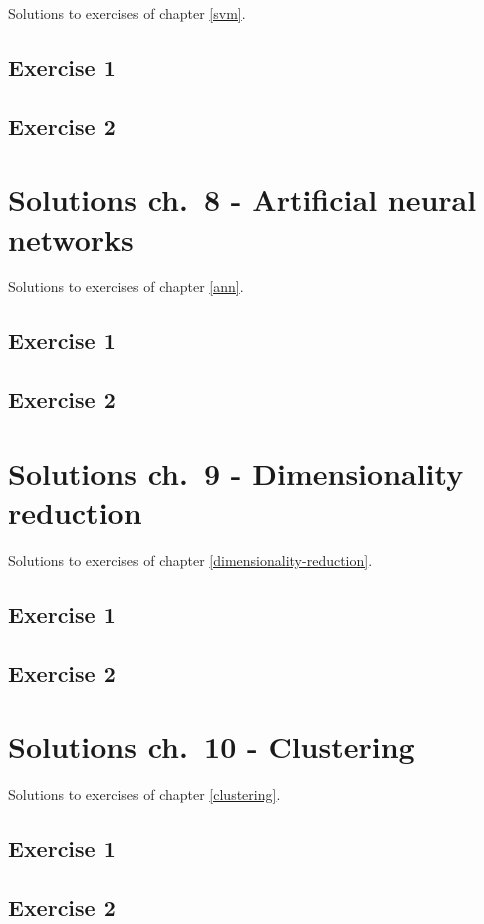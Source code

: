 \documentclass[]{book}
\theoremstyle{definition}
\theoremstyle{definition}
\theoremstyle{definition}
\theoremstyle{remark}
\begin{document}
Solutions to exercises of chapter \ref{svm}.

\section{Exercise 1}\label{exercise-1-4}

\section{Exercise 2}\label{exercise-2-4}

\chapter{Solutions ch.~8 - Artificial neural
networks}\label{solutions-ann}

Solutions to exercises of chapter \ref{ann}.

\section{Exercise 1}\label{exercise-1-5}

\section{Exercise 2}\label{exercise-2-5}

\chapter{Solutions ch.~9 - Dimensionality
reduction}\label{solutions-dimensionality-reduction}

Solutions to exercises of chapter \ref{dimensionality-reduction}.

\section{Exercise 1}\label{exercise-1-6}

\section{Exercise 2}\label{exercise-2-6}

\chapter{Solutions ch.~10 - Clustering}\label{solutions-clustering}

Solutions to exercises of chapter \ref{clustering}.

\section{Exercise 1}\label{exercise-1-7}

\section{Exercise 2}\label{exercise-2-7}


\end{document}
